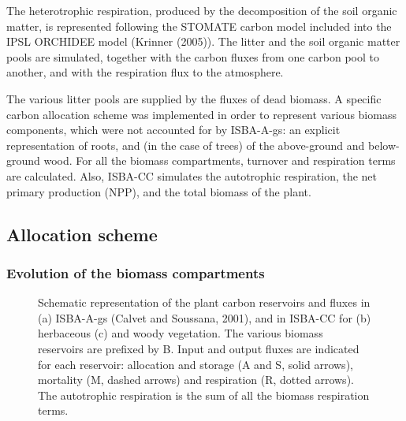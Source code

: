 {The heterotrophic respiration, produced by the decomposition of the soil organic matter, 
is represented following the STOMATE carbon model included into the IPSL ORCHIDEE model (Krinner \etal (2005)\nocite{Krinner2005}). 
The litter and the soil organic matter pools are simulated, together with the carbon fluxes 
from one carbon pool to another, and with the respiration flux to the atmosphere.

The various litter pools are supplied by the fluxes of dead biomass. 
A specific carbon allocation scheme was implemented in order to represent various biomass components, 
which were not accounted for by ISBA-A-gs: an explicit representation of roots, and (in the case of trees) 
of the above-ground and below-ground wood.
For all the biomass compartments, turnover and respiration terms are calculated. 
Also, ISBA-CC simulates the autotrophic respiration, the net primary production (NPP), 
and the total biomass of the plant.


\subsection{{Allocation scheme \label{sect:isbacc_biom}}}

\subsubsection{Evolution of the biomass compartments}

\begin{figure}[h]
\begin{center}
\caption{Schematic representation of the plant carbon reservoirs and fluxes in (a) ISBA-A-gs 
(Calvet and Soussana, 2001), and in ISBA-CC for (b) herbaceous (c) and woody 
vegetation. The various biomass reservoirs are prefixed by B. Input and output fluxes are indicated for
each reservoir: allocation and storage (A and S, solid arrows), mortality (M, dashed arrows)
and respiration (R, dotted arrows). The autotrophic respiration is the sum of all the biomass respiration terms.}
\label{fig_alloc}
\end{center}
\end{figure}

}
